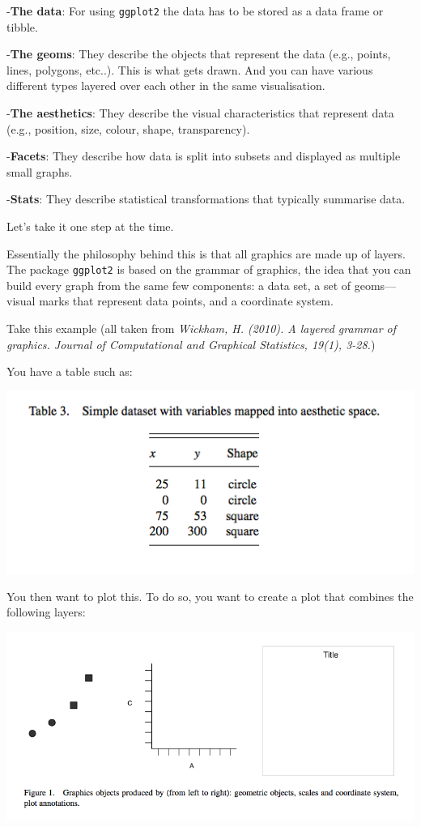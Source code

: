 \documentclass[
]{book}
\begin{document}
-\textbf{The data}: For using \texttt{ggplot2} the data has to be stored as a data frame or tibble.

-\textbf{The geoms}: They describe the objects that represent the data (e.g., points, lines, polygons, etc..). This is what gets drawn. And you can have various different types layered over each other in the same visualisation.

-\textbf{The aesthetics}: They describe the visual characteristics that represent data (e.g., position, size, colour, shape, transparency).

-\textbf{Facets}: They describe how data is split into subsets and displayed as multiple small graphs.

-\textbf{Stats}: They describe statistical transformations that typically summarise data.

Let's take it one step at the time.

Essentially the philosophy behind this is that all graphics are made up of layers. The package \texttt{ggplot2} is based on the grammar of graphics, the idea that you can build every graph from the same few components: a data set, a set of geoms---visual marks that represent data points, and a coordinate system.

Take this example (all taken from \emph{Wickham, H. (2010). A layered grammar of graphics. Journal of Computational and Graphical Statistics, 19(1), 3-28.})

You have a table such as:

\includegraphics{img/table.png}

You then want to plot this. To do so, you want to create a plot that combines the following layers:

\includegraphics{img/layers.png}
\end{document}
